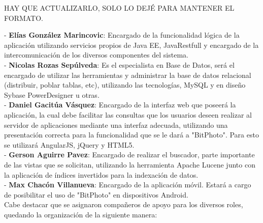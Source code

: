 \documentclass{memoria}
\begin{document}













HAY QUE ACTUALIZARLO, SOLO LO DEJÉ PARA MANTENER EL FORMATO.

- \textbf{Elías González Marincovic}: Encargado de la funcionalidad lógica de la aplicación utilizando servicios propios de Java EE, JavaRestfull y encargado de la intercomunicación de los diversos componentes del sistema.\\

- \textbf{Nicolas Rozas Sepúlveda}: Es el especialista en Base de Datos, será el encargado de utilizar las herramientas y administrar la base de datos relacional (distribuir, poblar tablas, etc), utilizando las tecnologías, MySQL y en diseño Sybase PowerDesigner u otras.\\

- \textbf{Daniel Gacitúa Vásquez}: Encargado de la interfaz web que poseerá la aplicación, la cual debe  facilitar las consultas que los usuarios deseen realizar al servidor de aplicaciones mediante una interfaz adecuada, utilizando una presentación correcta para la funcionalidad que se le dará a "BitPhoto". Para esto se utilizará AngularJS, jQuery y HTML5.\\

- \textbf{Gerson Aguirre Pavez}: Encargado de realizar el buscador, parte importante de las vistas que se solicitan, utilizando la herramienta Apache Lucene junto con la aplicación de índices invertidos para la indexación de datos.\\

- \textbf{Max Chacón Villanueva}: Encargado de la aplicación móvil. Estará a cargo de posibilitar el uso de "BitPhoto" en dispositivos Android.\\


Cabe destacar que se asignaron compañeros de apoyo para los diversos roles, quedando la organización de la siguiente manera:
\end{document}
